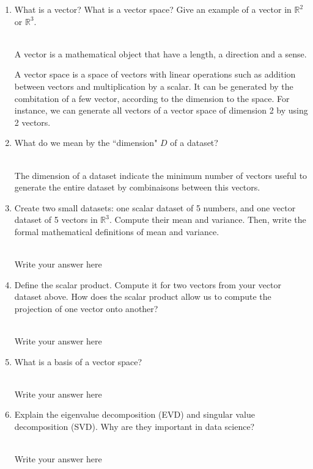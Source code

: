 \documentclass[a4paper]{article}
\begin{document}
\begin{enumerate}
	\item What is a vector? What is a vector space? Give an example of a vector in $\mathbb{R}^2$ or $\mathbb{R}^3$.
    
    \hrulefill\\
    A vector is a mathematical object that have a length, a direction and a sense.

    A vector space is a space of vectors with linear operations such as addition between vectors and multiplication by a scalar.
    It can be generated by the combitation of a few vector, according to the dimension to the space.
    For instance, we can generate all vectors of a vector space of dimension 2 by using 2 vectors.

    \item What do we mean by the ``dimension" $D$ of a dataset?
        
    \hrulefill\\
    The dimension of a dataset indicate the minimum number of vectors useful to generate the entire dataset by combinaisons between this vectors.
    
    \item Create two small datasets: one scalar dataset of 5 numbers, and one vector dataset of 5 vectors in $\mathbb{R}^3$. Compute their mean and variance. Then, write the formal mathematical definitions of mean and variance. 
        
    \hrulefill\\
    Write your answer here

    \item Define the scalar product. Compute it for two vectors from your vector dataset above. How does the scalar product allow us to compute the projection of one vector onto another?
        
    \hrulefill\\
    Write your answer here
    
    \item What is a basis of a vector space? 
        
    \hrulefill\\
    Write your answer here
    
    \item Explain the eigenvalue decomposition (EVD) and singular value decomposition (SVD). Why are they important in data science?
        
    \hrulefill\\
    Write your answer here
    

\end{enumerate}
\end{document}
